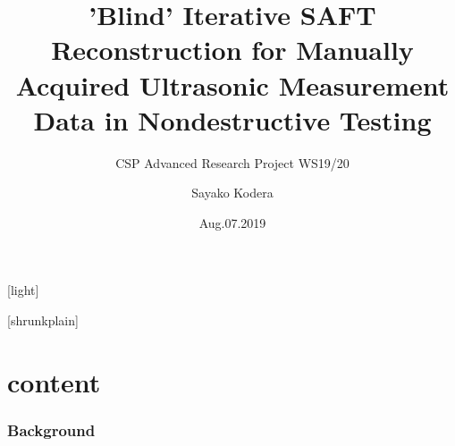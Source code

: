 \documentclass[14pt,compress,aspectratio=169]{beamer} %
\title{'Blind' Iterative SAFT Reconstruction for Manually Acquired Ultrasonic Measurement Data in Nondestructive Testing}
\subtitle{CSP Advanced Research Project WS19/20}
\institute{\foreignlanguage{german}{Technische Universität Ilmenau}}
\author{Sayako Kodera}
\date{Aug.07.2019}
\begin{document}
[light]
\begin{frame}[noframenumbering] %
 	\titlepage
\end{frame}

[shrunkplain]

\part{content}

\section{Background}
\end{document}
